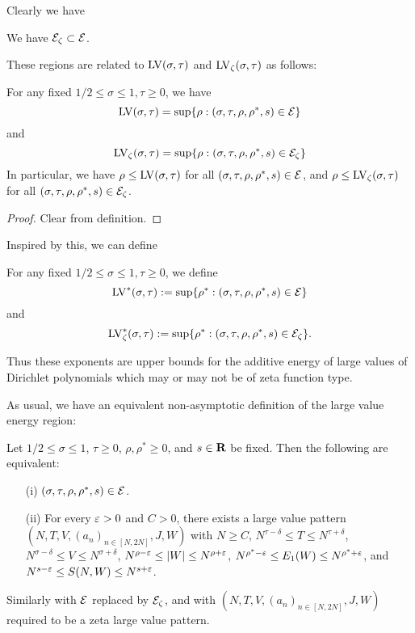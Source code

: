 Clearly we have

\begin{lemma}\label{triv-contain} We have $\mathcal{E}_\zeta \subset \mathcal{E}$.
\end{lemma}

These regions are related to $\mathrm{LV}(\sigma,\tau)$ and $\mathrm{LV}_{\zeta}(\sigma,\tau)$ as follows:

\begin{lemma}\label{energy-region-lv} For any fixed $1/2 \leq \sigma \leq 1, \tau \geq 0$, we have
$$ \mathrm{LV}(\sigma,\tau) = \sup \{ \rho: (\sigma,\tau,\rho,\rho^*,s) \in \mathcal{E}\}$$
and
$$ \mathrm{LV}_\zeta(\sigma,\tau) = \sup \{ \rho: (\sigma,\tau,\rho,\rho^*,s) \in \mathcal{E}_\zeta\}$$
In particular, we have $\rho \leq \mathrm{LV}(\sigma,\tau)$ for all $(\sigma,\tau,\rho,\rho^*,s) \in \mathcal{E}$, and $\rho \leq \mathrm{LV}_\zeta(\sigma,\tau)$ for all $(\sigma,\tau,\rho,\rho^*,s) \in \mathcal{E}_\zeta$.
\end{lemma}

\begin{proof} Clear from definition.
\end{proof}

Inspired by this, we can define

\begin{definition}\label{lvze-def}  For any fixed $1/2 \leq \sigma \leq 1, \tau \geq 0$, we define
$$ \mathrm{LV}^*(\sigma,\tau) := \sup \{ \rho^*: (\sigma,\tau,\rho,\rho^*,s) \in \mathcal{E}\}$$
and
$$ \mathrm{LV}^*_\zeta(\sigma,\tau) := \sup \{ \rho^*: (\sigma,\tau,\rho,\rho^*,s) \in \mathcal{E}_\zeta\}.$$
\end{definition}

Thus these exponents are upper bounds for the additive energy of large values of Dirichlet polynomials which may or may not be of zeta function type.

As usual, we have an equivalent non-asymptotic definition of the large value energy region:

\begin{lemma}\label{lve-asymp} Let $1/2 \leq \sigma \leq 1$, $\tau \geq 0$,  $\rho, \rho^* \geq 0$, and $s \in \mathbf{R}$ be fixed.  Then the following are equivalent:
    \begin{itemize}
    \item[(i)] $(\sigma,\tau,\rho,\rho^*,s) \in \mathcal{E}$.
    \item[(ii)] For every $\varepsilon>0$ and $C > 0$, there exists a large value pattern $(N,T,V,(a_n)_{n \in [N,2N]},J,W)$ with $N \geq C$, $N^{\tau-\delta} \leq T \leq N^{\tau+\delta}$, $N^{\sigma-\delta} \leq V \leq N^{\sigma+\delta}$,
    $N^{\rho-\varepsilon} \leq |W| \leq N^{\rho+\varepsilon}$,
    $N^{\rho^*-\varepsilon} \leq E_1(W) \leq N^{\rho^*+\varepsilon}$, and
    $N^{s-\varepsilon} \leq S(N, W) \leq N^{s+\varepsilon}$.
    \end{itemize}
    Similarly with $\mathcal{E}$ replaced by $\mathcal{E}_\zeta$, and with $(N,T,V,(a_n)_{n \in [N,2N]},J,W)$ required to be a zeta large value pattern.
\end{lemma}

